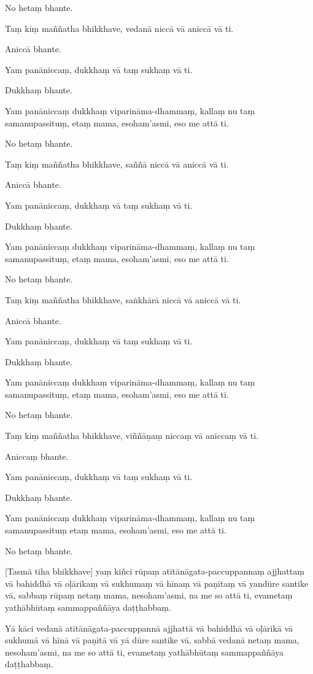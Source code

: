 No hetaṃ bhante.

Taṃ kiṃ maññatha bhikkhave, vedanā niccā vā aniccā vā ti.

Aniccā bhante.

Yam panāniccaṃ, dukkhaṃ vā taṃ sukhaṃ vā ti.

Dukkhaṃ bhante.

Yam panāniccaṃ dukkhaṃ viparināma-dhammaṃ, kallaṃ nu taṃ samanupassituṃ,
etaṃ mama, esoham'asmi, eso me attā ti.

No hetaṃ bhante.

Taṃ kiṃ maññatha bhikkhave, saññā niccā vā aniccā vā ti.

Aniccā bhante.

Yam panāniccaṃ, dukkhaṃ vā taṃ sukhaṃ vā ti.

Dukkhaṃ bhante.

Yam panāniccaṃ dukkhaṃ viparināma-dhammaṃ, kallaṃ nu taṃ samanupassituṃ,
etaṃ mama, esoham'asmi, eso me attā ti.

No hetaṃ bhante.

Taṃ kiṃ maññatha bhikkhave, saṅkhārā niccā vā aniccā vā ti.

Aniccā bhante.

Yam panāniccaṃ, dukkhaṃ vā taṃ sukhaṃ vā ti.

Dukkhaṃ bhante.

Yam panāniccaṃ dukkhaṃ viparināma-dhammaṃ, kallaṃ nu taṃ samanupassituṃ,
etaṃ mama, esoham'asmi, eso me attā ti.

No hetaṃ bhante.

Taṃ kiṃ maññatha bhikkhave, viññāṇaṃ niccaṃ vā aniccaṃ vā ti.

Aniccaṃ bhante.

Yam panāniccaṃ, dukkhaṃ vā taṃ sukhaṃ vā ti.

Dukkhaṃ bhante.

Yam panāniccaṃ dukkhaṃ viparināma-dhammaṃ, kallaṃ nu taṃ samanupassituṃ
etaṃ mama, esoham'asmi, eso me attā ti.

No hetaṃ bhante.

[Tasmā tiha bhikkhave] yaṃ kiñci rūpaṃ atītānāgata-paccuppannaṃ ajjhattaṃ
vā bahiddhā vā oḷārikaṃ vā sukhumaṃ vā hīnaṃ vā paṇītaṃ vā yandūre
santike vā, sabbaṃ rūpaṃ netaṃ mama, nesoham'asmi, na me so attā ti,
evametaṃ yathābhūtaṃ sammappaññāya daṭṭhabbaṃ.

Yā kāci vedanā atītānāgata-paccuppannā ajjhattā vā bahiddhā vā oḷārikā
vā sukhumā vā hīnā vā paṇītā vā yā dūre santike vā, sabbā vedanā netaṃ
mama, nesoham'asmi, na me so attā ti, evametaṃ yathābhūtaṃ sammappaññāya
daṭṭhabbaṃ.

